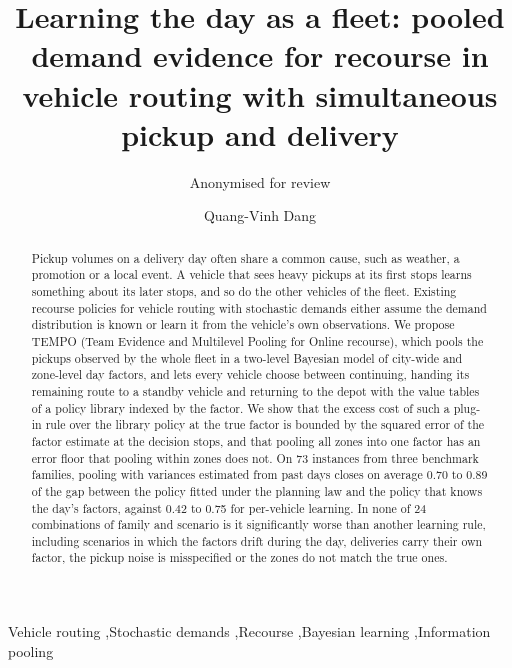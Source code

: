 \documentclass[preprint,authoryear,12pt]{elsarticle}
\begin{document}
\begin{frontmatter}

\title{Learning the day as a fleet: pooled demand evidence for
recourse in vehicle routing with simultaneous pickup and delivery}

\ifanon
  \author{Anonymised for review}
\else
  \author{Quang-Vinh Dang}
  \address{British University Vietnam, Hung Yen, Vietnam}
\fi

\begin{abstract}
Pickup volumes on a delivery day often share a common cause, such as
weather, a promotion or a local event. A vehicle that sees heavy pickups
at its first stops learns something about its later stops, and so do
the other vehicles of the fleet. Existing recourse policies for vehicle
routing with stochastic demands either assume the demand distribution is
known or learn it from the vehicle's own observations. We propose TEMPO
(Team Evidence and Multilevel Pooling for Online recourse), which pools
the pickups observed by the whole fleet in a two-level Bayesian model of
city-wide and zone-level day factors, and lets every vehicle choose
between continuing, handing its remaining route to a standby vehicle and
returning to the depot with the value tables of a policy library indexed
by the factor. We show that the excess cost of such a plug-in rule over
the library policy at the true factor is bounded by the squared error of
the factor estimate at the decision stops, and that pooling all zones
into one factor has an error floor that pooling within zones does not. On 73 instances from three
benchmark families, pooling with variances estimated from past days
closes on average 0.70 to 0.89 of the gap between the policy fitted
under the planning law and the policy that knows the day's factors,
against 0.42 to 0.75 for per-vehicle learning. In none of 24
combinations of family and scenario is it significantly worse than
another learning rule, including scenarios in which the factors drift
during the day, deliveries carry their own factor, the pickup noise is
misspecified or the zones do not match the true ones.
\end{abstract}

\begin{keyword}
Vehicle routing \sep Stochastic demands \sep Recourse \sep Bayesian
learning \sep Information pooling
\end{keyword}
\end{frontmatter}

\end{document}
